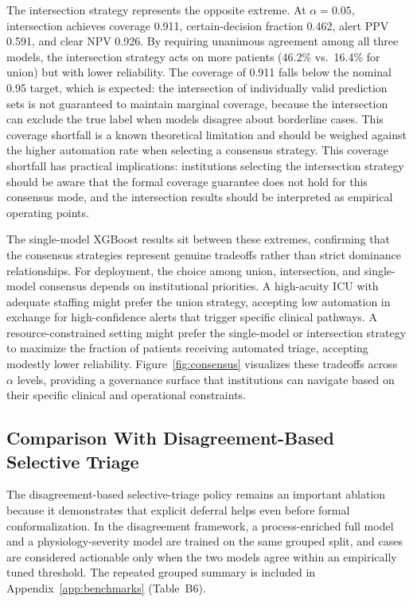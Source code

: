 The intersection strategy represents the opposite extreme. At $\alpha=0.05$, intersection achieves coverage 0.911, certain-decision fraction 0.462, alert PPV 0.591, and clear NPV 0.926. By requiring unanimous agreement among all three models, the intersection strategy acts on more patients (46.2\% vs.\ 16.4\% for union) but with lower reliability. The coverage of 0.911 falls below the nominal 0.95 target, which is expected: the intersection of individually valid prediction sets is not guaranteed to maintain marginal coverage, because the intersection can exclude the true label when models disagree about borderline cases. This coverage shortfall is a known theoretical limitation and should be weighed against the higher automation rate when selecting a consensus strategy. This coverage shortfall has practical implications: institutions selecting the intersection strategy should be aware that the formal coverage guarantee does not hold for this consensus mode, and the intersection results should be interpreted as empirical operating points.

The single-model XGBoost results sit between these extremes, confirming that the consensus strategies represent genuine tradeoffs rather than strict dominance relationships. For deployment, the choice among union, intersection, and single-model consensus depends on institutional priorities. A high-acuity ICU with adequate staffing might prefer the union strategy, accepting low automation in exchange for high-confidence alerts that trigger specific clinical pathways. A resource-constrained setting might prefer the single-model or intersection strategy to maximize the fraction of patients receiving automated triage, accepting modestly lower reliability. Figure~\ref{fig:consensus} visualizes these tradeoffs across $\alpha$ levels, providing a governance surface that institutions can navigate based on their specific clinical and operational constraints.

\subsection{Comparison With Disagreement-Based Selective Triage}

The disagreement-based selective-triage policy remains an important ablation because it demonstrates that explicit deferral helps even before formal conformalization. In the disagreement framework, a process-enriched full model and a physiology-severity model are trained on the same grouped split, and cases are considered actionable only when the two models agree within an empirically tuned threshold. The repeated grouped summary is included in Appendix~\ref{app:benchmarks} (Table~B6).


